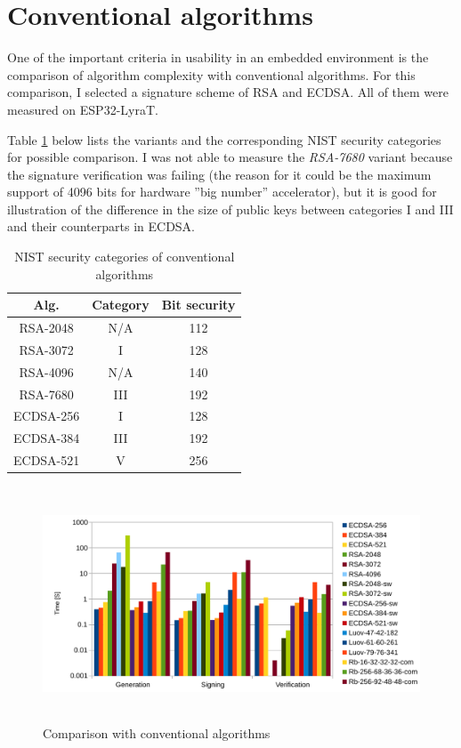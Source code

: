 \documentclass[thesis=M,english]{FITthesis}[2019/12/23]
\begin{document}
\section{Conventional algorithms}
One of the important criteria in usability in an embedded environment is the comparison of algorithm complexity with conventional algorithms. For this comparison, I selected a signature scheme of RSA and ECDSA. All of them were measured on ESP32-LyraT. 

\bigskip
\noindent
Table \ref{conv-NIST-sec-cate} below lists the variants and the corresponding NIST security categories for possible comparison. \cite{L-NIST-RECOMM} I was not able to measure the \textit{RSA-7680} variant because the signature verification was failing (the reason for it could be the maximum support of 4096 bits for hardware ”big number” accelerator), but it is good for illustration of the difference in the size of public keys between categories I and III and their counterparts in ECDSA. 
\begin{table}[H]
\centering
\begin{tabular}{|c|c|c|}
\hline
Alg. & Category & Bit security \\ \hline
RSA-2048 & N/A & 112 \\ \hline
RSA-3072 & I & 128 \\ \hline
RSA-4096 & N/A & 140 \\ \hline
RSA-7680 & III & 192 \\ \hline
ECDSA-256 & I & 128 \\ \hline
ECDSA-384 & III & 192 \\ \hline
ECDSA-521 & V & 256 \\ \hline
\end{tabular}
\caption{NIST security categories of conventional algorithms}
\label{conv-NIST-sec-cate}
\end{table}

\begin{figure}[H]
\centering
\includegraphics[width=13cm,height=7cm]{images/time-all.pdf}
\caption{Comparison with conventional algorithms}
\label{time-all}
\end{figure}
\end{document}
